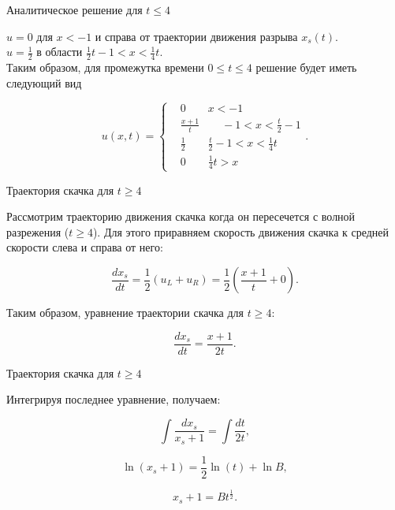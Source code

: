 \documentclass[10pt,xcolor=pst,aspectratio=169]{beamer}
\begin{document}
\begin{frame}{Аналитическое решение для $t \leq 4$}

	\transdissolve[duration=0.1]
	\justifying
	\large

	$u = 0$ для $x < -1$ и справа от траектории движения разрыва $x_{s}(t)$.\\

	$u = \frac{1}{2}$ в области $\frac{1}{2} t - 1 < x < \frac{1}{4} t$.\\

	Таким образом, для промежутка времени $0 \leq t \leq 4$ решение будет иметь следующий вид

	\[
		u(x, t) =
			\begin{cases}
				&0 \qquad x < -1\\
				&\frac{x+1}{t} \qquad -1 < x < \frac{t}{2} - 1\\
				&\frac{1}{2} \qquad \frac{t}{2} - 1 < x < \frac{1}{4} t\\
				&0 \qquad \frac{1}{4} t > x
			\end{cases}.
	\]

\end{frame}

\begin{frame}{Траектория скачка для $t \geq 4$}

	\transdissolve[duration=0.1]
	\justifying
	\large

	Рассмотрим траекторию движения скачка когда он пересечется с волной разрежения ($t \geq 4$). Для этого приравняем скорость движения скачка к средней скорости слева и справа от него:

	\[
		\frac{d x_{s}}{d t} = \frac{1}{2} \left( u_{L} + u_{R} \right) = \frac{1}{2} \left( \frac{x + 1}{t} + 0 \right).
	\]

	Таким образом, уравнение траектории скачка для $t \geq 4$:

	\[
		\frac{d x_{s}}{d t} = \frac{x + 1}{2 t}.
	\]

\end{frame}

\begin{frame}{Траектория скачка для $t \geq 4$}

	\transdissolve[duration=0.1]
	\justifying
	\large

	Интегрируя последнее уравнение, получаем:

	\[
		\int \frac{d x_{s}}{x_{s} + 1} = \int \frac{d t}{2 t},
	\]

	\[
		\ln (x_{s} + 1) = \frac{1}{2} \ln (t) + \ln B,
	\]

	\[
		x_{s} + 1 = B t^{\frac{1}{2}}.
	\]

\end{frame}
\end{document}
